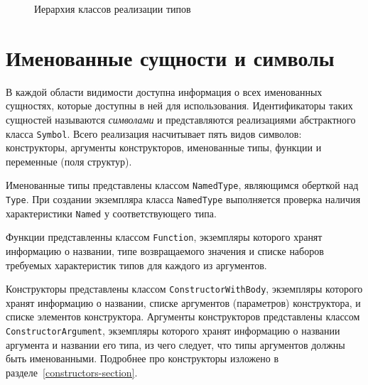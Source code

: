 \documentclass[times,specification,annotation]{style/itmo-student-thesis/itmo-student-thesis}
\begin{document}
\begin{figure}[!h]
\caption{Иерархия классов реализации типов}\label{type-classes-hierarchy}
\centering
{}%

\end{figure}

\section{Именованные сущности и символы}

В каждой области видимости доступна информация о всех именованных сущностях, которые доступны в ней для использования. Идентификаторы таких сущностей называются \textit{символами} и представляются реализациями абстрактного класса \texttt{Symbol}. Всего реализация насчитывает пять видов символов: конструкторы, аргументы конструкторов, именованные типы, функции и переменные (поля структур). 

Именованные типы представлены классом \texttt{NamedType}, являющимся оберткой над \texttt{Type}. При создании экземпляра класса \texttt{NamedType} выполняется проверка наличия характеристики \texttt{Named} у соответствующего типа.

Функции представленны классом \texttt{Function}, экземпляры которого хранят информацию о названии, типе возвращаемого значения и списке наборов требуемых характеристик типов для каждого из аргументов.

Конструкторы представлены классом \texttt{ConstructorWithBody}, экземпляры которого хранят информацию о названии, списке аргументов (параметров) конструктора, и списке элементов конструктора. Аргументы конструкторов представлены классом \texttt{ConstructorArgument}, экземпляры которого хранят информацию о названии аргумента и названии его типа, из чего следует, что типы аргументов должны быть именованными. Подробнее про конструкторы изложено в разделе~\ref{constructors-section}.
\end{document}
